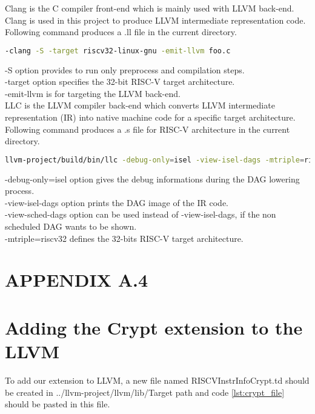 Clang is the C compiler front-end which is mainly used with LLVM back-end. Clang is used in this project to produce LLVM intermediate representation code. Following command produces a .ll file in the current directory. 

\begin{lstlisting}[language=Bash]
-clang -S -target riscv32-linux-gnu -emit-llvm foo.c
\end{lstlisting}

-S option provides to run only preprocess and compilation steps. \\
-target option specifies the 32-bit RISC-V target architecture. \\
-emit-llvm is for targeting the LLVM back-end. \\

LLC is the LLVM compiler back-end which converts LLVM intermediate representation (IR) into native machine code for a specific target architecture. Following command produces a .s file for RISC-V architecture in the current directory. 

\begin{lstlisting}[language=Bash]
llvm-project/build/bin/llc -debug-only=isel -view-isel-dags -mtriple=riscv32 lxr.ll
\end{lstlisting}

-debug-only=isel option gives the debug informations during the DAG lowering process.\\
-view-isel-dags option prints the DAG image of the IR code.\\
-view-sched-dags option can be used instead of -view-isel-dags, if the non scheduled DAG wants to be shown.\\
-mtriple=riscv32 defines the 32-bits RISC-V target architecture.\\
\newpage



\section*{APPENDIX A.4}
\renewcommand{\theequation}{A.2.\arabic{equation}}
\setcounter{equation}{0}
\section{Adding the Crypt extension to the LLVM}
To add our extension to LLVM, a new file named RISCVInstrInfoCrypt.td should be created in ../llvm-project/llvm/lib/Target path and code \ref{lst:crypt_file} should be pasted in this file.

